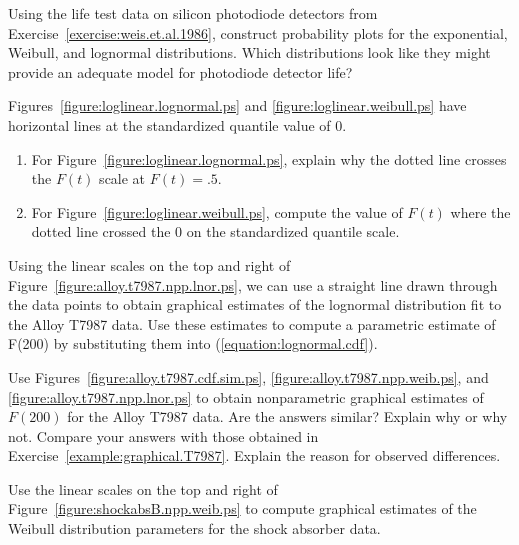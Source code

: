 \begin{exercise}
Using the life test data on silicon photodiode detectors 
from Exercise~\ref{exercise:weis.et.al.1986},
construct probability plots for the
exponential, Weibull, and lognormal distributions.
Which distributions look like they might provide
an adequate model for photodiode detector life?
\end{exercise}


\begin{exercise}
Figures~\ref{figure:loglinear.lognormal.ps} and 
\ref{figure:loglinear.weibull.ps} have horizontal lines at the 
standardized quantile value of 0.
\begin{enumerate}
\item
For Figure~\ref{figure:loglinear.lognormal.ps}, 
explain why the dotted line crosses the $F(t)$
scale at $F(t)=.5$.
\item
For Figure~\ref{figure:loglinear.weibull.ps}, compute the value of $F(t)$ 
where the dotted line crossed the 0 on the standardized quantile scale.
\end{enumerate}
\end{exercise}

\begin{exercise}
\label{example:graphical.T7987}
Using the linear scales on the top and right of 
Figure~\ref{figure:alloy.t7987.npp.lnor.ps},
we can use a straight line drawn through the data points to
obtain graphical estimates of the lognormal distribution fit to
the Alloy T7987 data. Use these estimates to compute a parametric estimate
of F(200) by substituting them into (\ref{equation:lognormal.cdf}).
\end{exercise}

\begin{exercise}
\label{example:graphical.T7987.a}
Use Figures~\ref{figure:alloy.t7987.cdf.sim.ps}, 
\ref{figure:alloy.t7987.npp.weib.ps}, and 
\ref{figure:alloy.t7987.npp.lnor.ps} to obtain nonparametric graphical
estimates of $F(200)$ for the Alloy T7987 data. Are the answers
similar? Explain why or why not. Compare your answers with those
obtained in Exercise~\ref{example:graphical.T7987}. Explain the reason
for observed differences.
\end{exercise}

\begin{exercise}
Use the linear scales on the top and right of 
Figure~\ref{figure:shockabsB.npp.weib.ps}
to compute graphical estimates of the Weibull distribution parameters
for the shock absorber data.
\end{exercise}


